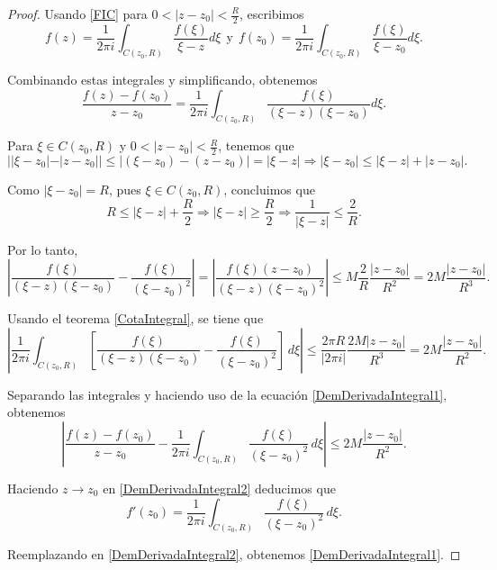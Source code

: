 \begin{proof}
Usando \ref{FIC} para $0 < |z-z_0| < \frac{R}{2}$,  escribimos
$$f(z) = \frac{1}{2\pi i} \int_{C(z_0,R)} \frac{f(\xi)}{\xi-z}d \xi ~~\mbox{y}~~ f(z_0) = \frac{1}{2\pi i} \int_{C(z_0,R)} \frac{f(\xi)}{\xi-z_0}d \xi.$$

Combinando estas integrales y simplificando, obtenemos
\begin{equation}
 \frac{f(z) - f(z_0)}{z-z_0} = \frac{1}{2\pi i}   \int_{C(z_0,R)} \frac{f(\xi)}{(\xi-z)(\xi - z_0)} d\xi. \label{DemDerivadaIntegral1}
\end{equation}

Para $\xi \in C(z_0,R)$ y $0 < |z-z_0| < \frac{R}{2}$, tenemos que
$$||\xi - z_0| - |z-z_0||\leq |(\xi-z_0) - (z-z_0) | =  |\xi - z| \Rightarrow |\xi - z_0| \leq |\xi -z| + |z-z_0|.$$

Como $|\xi - z_0| = R$, pues $\xi \in C(z_0,R)$, concluimos que
$$R \leq |\xi-z| + \frac{R}{2} \Rightarrow |\xi - z| \geq \frac{R}{2} \Rightarrow \frac{1}{|\xi - z|} \leq \frac{2}{R}.$$

Por lo tanto, 
$$\left| \frac{f(\xi)}{(\xi-z)(\xi-z_0)} - \frac{f(\xi)}{(\xi-z_0)^2} \right| = \left| \frac{f(\xi)(z-z_0)}{(\xi-z)(\xi-z_0)^2} \right| \leq M \frac{2}{R} \frac{|z-z_0|}{R^2} = 2M \frac{|z-z_0|}{R^3}.$$

Usando el teorema \ref{CotaIntegral}, se tiene que 
$$\left| \frac{1}{2\pi i} \int_{C(z_0,R)}\left[  \frac{f(\xi)}{(\xi-z)(\xi-z_0)} - \frac{f(\xi)}{(\xi-z_0)^2}\right] \,d\xi \right| \leq \frac{2\pi R}{|2\pi i|} \frac{2M|z-z_0|}{R^3} = 2M \frac{|z-z_0|}{R^2}.$$

Separando las integrales y haciendo uso de la ecuación \eqref{DemDerivadaIntegral1}, obtenemos
\begin{equation}
 \left| \frac{f(z)-f(z_0)}{z-z_0} - \frac{1}{2\pi i}\int_{C(z_0,R)} \frac{f(\xi)}{(\xi-z_0)^2} \,d\xi \right|  \leq 2M \frac{|z-z_0|}{R^2}. \label{DemDerivadaIntegral2}
\end{equation}

Haciendo $z \to z_0$ en \eqref{DemDerivadaIntegral2} deducimos que 
$$f'(z_0) = \frac{1}{2\pi i} \int_{C(z_0,R)} \frac{f(\xi)}{(\xi - z_0)^2} \,d\xi.$$

Reemplazando en \eqref{DemDerivadaIntegral2}, obtenemos \eqref{DemDerivadaIntegral1}.
\end{proof}

